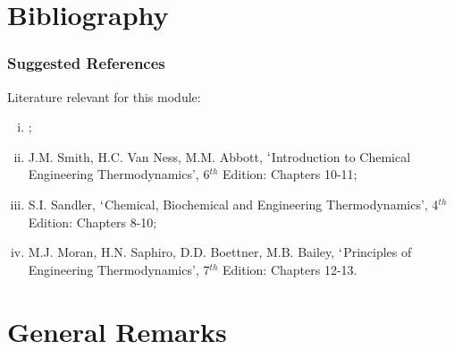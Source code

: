 \documentclass[10pt,compress,handout,ignorenonframetext,unknownkeysallowed]{beamer}
\begin{document}
\section{Bibliography}
\begin{frame}
 \frametitle{Suggested References}
  Literature relevant for this module:
  \begin{enumerate}[(i)]
   \item {};
   \item\label{SVN_Book} J.M. Smith, H.C. Van Ness, M.M. Abbott, $\lq$Introduction to Chemical Engineering Thermodynamics', 6$^{th}$ Edition: Chapters 10-11;
   \item\label{Sandle_Book} S.I. Sandler, $\lq$Chemical, Biochemical and Engineering Thermodynamics', 4$^{th}$ Edition: Chapters 8-10;
   \item M.J. Moran, H.N. Saphiro, D.D. Boettner, M.B. Bailey, $\lq$Principles of Engineering Thermodynamics', 7$^{th}$ Edition: Chapters 12-13.
  \end{enumerate}
\end{frame}



\section{General Remarks}
\end{document}
